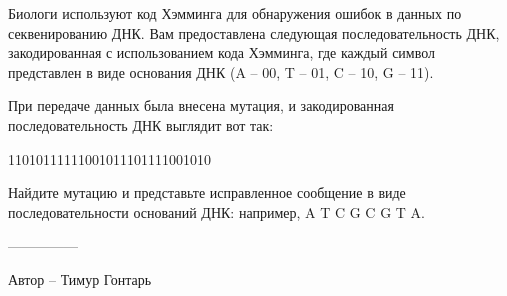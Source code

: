 \question
Биологи используют код Хэмминга для обнаружения ошибок в данных по секвенированию ДНК. Вам предоставлена следующая последовательность ДНК, закодированная с использованием кода Хэмминга, где каждый символ представлен в виде основания ДНК (A -- 00, T -- 01, C -- 10, G -- 11).

При передаче данных была внесена мутация, и закодированная последовательность ДНК выглядит вот так: 
\begin{center}
11010111111001011101111001010
\end{center}

Найдите мутацию и представьте исправленное сообщение в виде последовательности оснований ДНК: например, A T C G C G T A.

---------------

Автор -- Тимур Гонтарь